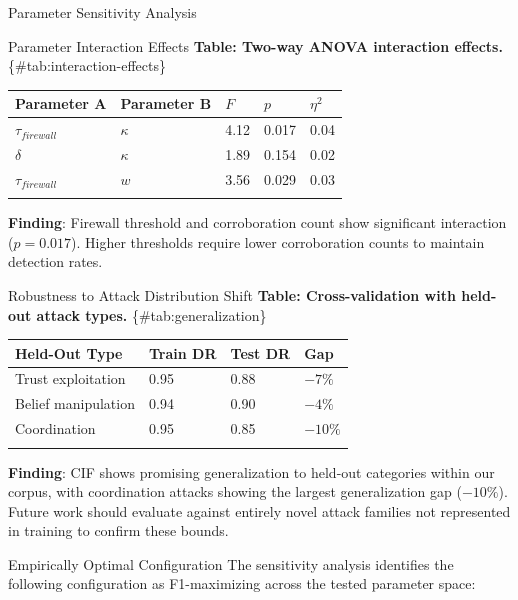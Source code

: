 \documentclass[
  ignorenonframetext,
]{beamer}
\newcounter{none} %
\begin{document}
\begin{frame}[fragile]{Parameter Sensitivity Analysis}
\begin{block}{Parameter Interaction Effects}
\protect{}\label{sec:combined-sensitivity}
\textbf{Table: Two-way ANOVA interaction effects.}
\{\#tab:interaction-effects\}

{\def\LTcaptype{none} %
\begin{longtable}[]{@{}lllll@{}}
\toprule\noalign{}
Parameter A & Parameter B & \(F\) & \(p\) & \(\eta^2\) \\
\midrule\noalign{}
\endhead
\(\tau_{firewall}\) & \(\kappa\) & 4.12 & 0.017 & 0.04 \\
\(\delta\) & \(\kappa\) & 1.89 & 0.154 & 0.02 \\
\(\tau_{firewall}\) & \(w\) & 3.56 & 0.029 & 0.03 \\
\bottomrule\noalign{}
\end{longtable}
}

\textbf{Finding}: Firewall threshold and corroboration count show
significant interaction (\(p = 0.017\)). Higher thresholds require lower
corroboration counts to maintain detection rates.
\end{block}

\begin{block}{Robustness to Attack Distribution Shift}
\protect{}\label{sec:robustness}
\textbf{Table: Cross-validation with held-out attack types.}
\{\#tab:generalization\}

{\def\LTcaptype{none} %
\begin{longtable}[]{@{}llll@{}}
\toprule\noalign{}
Held-Out Type & Train DR & Test DR & Gap \\
\midrule\noalign{}
\endhead
Trust exploitation & 0.95 & 0.88 & \(-7\%\) \\
Belief manipulation & 0.94 & 0.90 & \(-4\%\) \\
Coordination & 0.95 & 0.85 & \(-10\%\) \\
\bottomrule\noalign{}
\end{longtable}
}

\textbf{Finding}: CIF shows promising generalization to held-out
categories within our corpus, with coordination attacks showing the
largest generalization gap (\(-10\%\)). Future work should evaluate
against entirely novel attack families not represented in training to
confirm these bounds.
\end{block}

\begin{block}{Empirically Optimal Configuration}
\protect{}\label{sec:optimal-config}
The sensitivity analysis identifies the following configuration as
F1-maximizing across the tested parameter space:


\end{block}
\end{frame}
\end{document}
